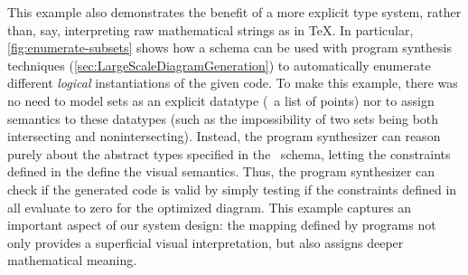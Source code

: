 This example also demonstrates the benefit of a more explicit type system, rather than, say, interpreting raw mathematical strings as in \TeX.  In particular, \cref{fig:enumerate-subsets} shows how a \Domain{} schema can be used with program synthesis techniques (\cref{sec:LargeScaleDiagramGeneration}) to automatically enumerate different \emph{logical} instantiations of the given \Substance{} code.  To make this example, there was no need to model sets as an explicit datatype (\eg\ a list of points) nor to assign semantics to these datatypes (such as the impossibility of two sets being both intersecting and nonintersecting). Instead, the program synthesizer can reason purely about the abstract types specified in the \Domain\ schema, letting the constraints defined in the \Style{} define the visual semantics. Thus, the program synthesizer can check if the generated code is valid by simply testing if the constraints defined in \Style{} all evaluate to zero for the optimized diagram.  This example captures an important aspect of our system design: the mapping defined by \Style{} programs not only provides a superficial visual interpretation, but also assigns deeper mathematical meaning.

